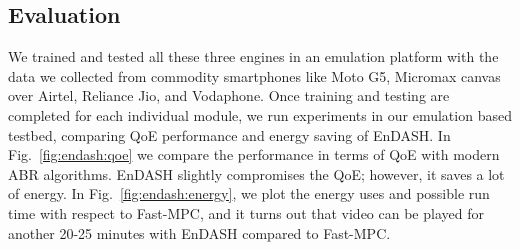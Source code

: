 \subsection{Evaluation}
We trained and tested all these three engines in an emulation platform with the data we collected from commodity smartphones like Moto G5, Micromax canvas over Airtel, Reliance Jio, and Vodaphone. Once training and testing are completed for each individual module, we run experiments in our emulation based testbed, comparing QoE performance and energy saving of EnDASH. In Fig.~\ref{fig:endash:qoe} we compare the performance in terms of QoE with modern ABR algorithms. EnDASH slightly compromises the QoE; however, it saves a lot of energy. In Fig.~\ref{fig:endash:energy}, we plot the energy uses and possible run time with respect to Fast-MPC, and it turns out that video can be played for another 20-25 minutes with EnDASH compared to Fast-MPC.
